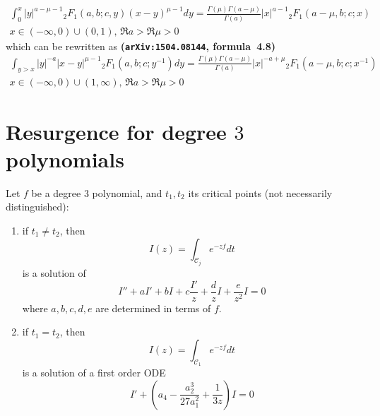 \documentclass[11pt,a4paper,twoside,leqno,noamsfonts]{amsart}
\numberwithin{equation}{section}
\begin{document}
\begin{multline}
\label{4.5}
\int_0^x |y|^{a-\mu-1}{}_2F_1\left(a,b;c,y\right)(x-y)^{\mu-1}dy=\frac{\Gamma(\mu)\Gamma(a-\mu)}{\Gamma(a)}|x|^{a-1}{}_2F_1\left(a-\mu,b;c;x\right)\\
x\in(-\infty,0)\cup(0,1), \, \Re a>\Re\mu>0
\end{multline}
which can be rewritten as \textbf{(\texttt{arXiv:1504.08144}, formula~4.8)}
\begin{multline}
\label{4.8}
\int_{y>x}|y|^{-a}|x-y|^{\mu-1}{}_2F_1\left(a,b;c;y^{-1}\right)dy=\frac{\Gamma(\mu)\Gamma(a-\mu)}{\Gamma(a)}|x|^{-a+\mu}{}_2F_1\left(a-\mu,b;c;x^{-1}\right)\\
x\in(-\infty,0)\cup(1,\infty), \, \Re a>\Re\mu>0
\end{multline}
%
%

\section{Resurgence for degree $3$ polynomials}

Let $f$ be a degree $3$ polynomial, and $t_{1},t_{2}$ its critical points (not necessarily distinguished):
\begin{enumerate}
\item if $t_{1}\neq t_{2}$, then 
\[I(z)=\int_{\mathcal{C}_{j}}e^{-zf}dt\]
is a solution of 
\begin{equation}
\label{eq:I for p not 0}
 I''+a I'+bI+c\frac{I'}{z}+\frac{d}{z}I+\frac{e}{z^2}I=0
\end{equation}
where $a,b,c,d,e$ are determined in terms of $f$.
\item if $t_{1}=t_2$, then 
\[I(z)=\int_{\mathcal{C}_{1}}e^{-zf}dt\]
is a solution of a first order ODE
\begin{equation}
I'+\left(a_4-\frac{a_2^3}{27a_1^2}+\frac{1}{3z}\right)I=0
\end{equation}
\end{enumerate}
\end{document}
